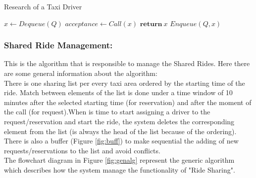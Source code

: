 \begin{algorithm}[H]
\caption{Research of a Taxi Driver}
\begin{algorithmic}[1]
	\Else
		\State $x \gets Dequeue(Q)$
		\State $acceptance \gets Call(x)$
			\State $\textbf{return} \: x$
		\Else
			\State $Enqueue(Q, x)$
		\EndIf
	\EndFor
\EndIf
\EndProcedure
\end{algorithmic}
\end{algorithm}

\subsubsection{Shared Ride Management:}
This is the algorithm that is responsible to manage the Shared Rides. Here there are some general information about the algorithm: \\
There is one sharing list per every taxi area ordered by the starting time of the ride. Match between elements of the list is done under a time window of 10 minutes after the selected starting time (for reservation) and after the moment of the call (for request).When is time to start assigning a driver to the request/reservation and start the ride, the system deletes the corresponding element from the list (is always the head of the list because of the ordering). There is also a buffer (Figure \ref{fig:buff}) to make sequential the adding of new requests/reservations to the list and avoid conflicts.\\
The flowchart diagram in Figure \ref{fig:genalg} represent the generic algorithm which describes how the system manage the functionality of "Ride Sharing".


